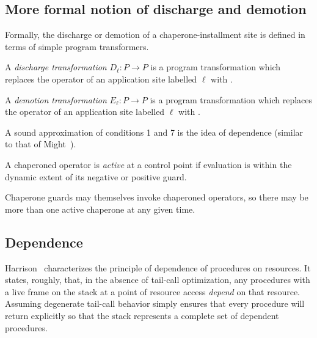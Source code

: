 

\subsection{More formal notion of discharge and demotion}

Formally, the discharge or demotion of a chaperone-installment site is defined in terms of simple program transformers.

\begin{definition}
A \emph{discharge transformation} $D_\ell : P\rightarrow P$ is a program transformation which replaces the operator of an application site labelled $\ell$ with .
\end{definition}

\begin{definition}
A \emph{demotion transformation} $E_\ell : P\rightarrow P$ is a program transformation which replaces the operator of an application site labelled $\ell$ with .
\end{definition}

A sound approximation of conditions 1 and 7 is the idea of dependence (similar to that of Might~\cite{might2009interprocedural}).

\begin{definition}
A chaperoned operator is \emph{active} at a control point if evaluation is within the dynamic extent of its negative or positive guard.
\end{definition}

Chaperone guards may themselves invoke chaperoned operators, so there may be more than one active chaperone at any given time.

\subsection{Dependence}

Harrison~\cite{harrison1989interprocedural} characterizes the principle of dependence of procedures on resources.
It states, roughly, that, in the absence of tail-call optimization, any procedures with a live frame on the stack at a point of resource access \emph{depend} on that resource.
Assuming degenerate tail-call behavior simply ensures that every procedure will return explicitly so that the stack represents a complete set of dependent procedures.

